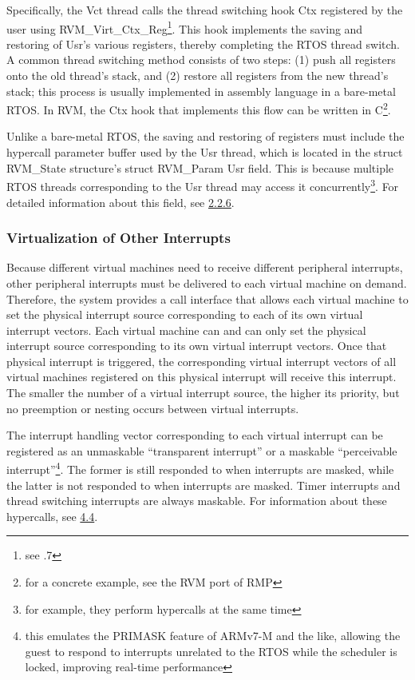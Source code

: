 Specifically, the Vct thread calls the thread switching hook Ctx registered by the user using RVM\_Virt\_Ctx\_Reg\footnote{see .7}. This hook implements the saving and restoring of Usr's various registers, thereby completing the RTOS thread switch. A common thread switching method consists of two steps: (1) push all registers onto the old thread's stack, and (2) restore all registers from the new thread's stack; this process is usually implemented in assembly language in a bare-metal RTOS. In RVM, the Ctx hook that implements this flow can be written in C\footnote{for a concrete example, see the RVM port of RMP}.

Unlike a bare-metal RTOS, the saving and restoring of registers must include the hypercall parameter buffer used by the Usr thread, which is located in the struct
RVM\_State structure's struct RVM\_Param
Usr field. This is because multiple RTOS threads corresponding to the Usr thread may access it concurrently\footnote{for example, they perform hypercalls at the same time}. For detailed information about this field, see \protect\hyperref[subsec:2-2-6]{2.2.6}.

\subsubsection{Virtualization of Other Interrupts}\label{subsubsec:2-2-4-3}

Because different virtual machines need to receive different peripheral interrupts, other peripheral interrupts must be delivered to each virtual machine on demand. Therefore, the system provides a call interface that allows each virtual machine to set the physical interrupt source corresponding to each of its own virtual interrupt vectors. Each virtual machine can and can only set the physical interrupt source corresponding to its own virtual interrupt vectors. Once that physical interrupt is triggered, the corresponding virtual interrupt vectors of all virtual machines registered on this physical interrupt will receive this interrupt. The smaller the number of a virtual interrupt source, the higher its priority, but no preemption or nesting occurs between virtual interrupts.

The interrupt handling vector corresponding to each virtual interrupt can be registered as an unmaskable ``transparent interrupt'' or a maskable ``perceivable interrupt''\footnote{this emulates the PRIMASK feature of ARMv7-M and the like, allowing the guest to respond to interrupts unrelated to the RTOS while the scheduler is locked, improving real-time performance}. The former is still responded to when interrupts are masked, while the latter is not responded to when interrupts are masked. Timer interrupts and thread switching interrupts are always maskable. For information about these hypercalls, see \protect\hyperref[sec:4-4]{4.4}.

